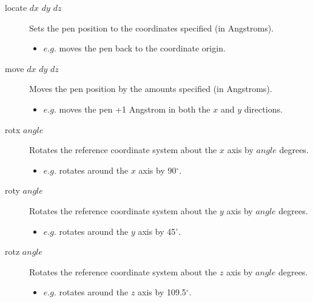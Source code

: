 \begin{description}
	\item[locate $dx$ $dy$ $dz$\its] Sets the pen position to the coordinates specified (in Angstroms).
	\begin{itemize}
		\item $e.g.$  moves the pen back to the coordinate origin.
	\end{itemize}

	\item[move $dx$ $dy$ $dz$\its] Moves the pen position by the amounts specified (in Angstroms).
	\begin{itemize}
		\item $e.g.$  moves the pen +1 Angstrom in both the $x$ and $y$ directions.
	\end{itemize}

	\item[rotx $angle$\its] Rotates the reference coordinate system about the $x$ axis by $angle$ degrees.
	\begin{itemize}
		\item $e.g.$  rotates around the $x$ axis by 90$^\circ$.
	\end{itemize}

	\item[roty $angle$\its] Rotates the reference coordinate system about the $y$ axis by $angle$ degrees.
	\begin{itemize}
		\item $e.g.$  rotates around the $y$ axis by 45$^\circ$.
	\end{itemize}

	\item[rotz $angle$\its] Rotates the reference coordinate system about the $z$ axis by $angle$ degrees.
	\begin{itemize}
		\item $e.g.$  rotates around the $z$ axis by 109.5$^\circ$.
	\end{itemize}

\end{description}


